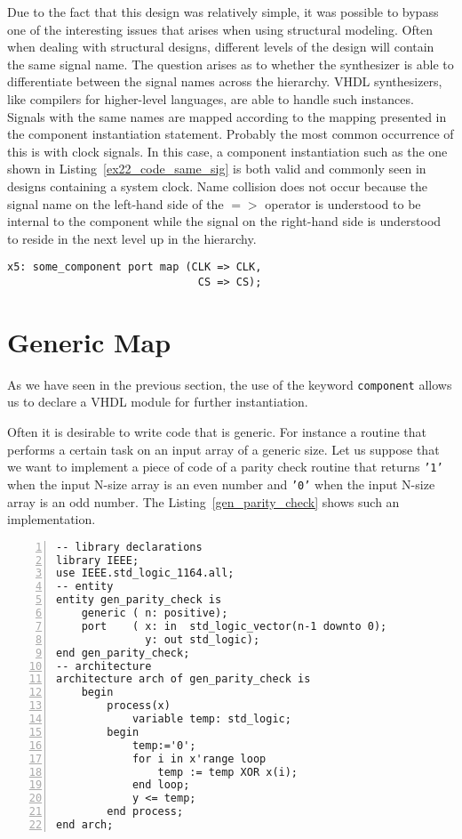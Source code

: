 Due to the fact that this design was relatively simple, it was possible to bypass one of the interesting issues that arises when using structural modeling. Often when dealing with structural designs, different levels of the design will contain the same signal name. The question arises as to whether the synthesizer is able to differentiate between the signal names across the hierarchy. VHDL synthesizers, like compilers for higher-level languages, are able to handle such instances. Signals with the same names are mapped according to the mapping presented in the component instantiation statement. Probably the most common occurrence of this is with clock signals. In this case, a component instantiation such as the one shown in Listing~\ref{ex22_code_same_sig} is both valid and commonly seen in designs containing a system clock. Name collision does not occur because the signal name on the left-hand side of the $=>$ operator is understood to be internal to the component while the signal on the right-hand side is understood to reside in the next level up in the hierarchy.

\noindent
\begin{minipage}{0.99\linewidth}
\begin{lstlisting}[label=ex22_code_same_sig, caption=Example of the same signal name crossing hierarchical boundaries.]
x5: some_component port map (CLK => CLK,
                              CS => CS);
\end{lstlisting}
\end{minipage}


\section{Generic Map}
As we have seen in the previous section, the use of the keyword \texttt{component} allows us to declare a VHDL module for further instantiation.

Often it is desirable to write code that is generic. For instance a routine that performs a certain task on an input array of a generic size. Let us suppose that we want to implement a piece of code of a parity check routine that returns \texttt{'1'} when the input N-size array is an even number and \texttt{'0'} when the input N-size array is an odd number. The Listing~\ref{gen_parity_check} shows such an implementation.

\noindent
\begin{minipage}{0.99\linewidth}
\begin{lstlisting}[numbers=left, label=gen_parity_check, caption= Parity check implementation with generic input array size.]
-- library declarations
library IEEE;
use IEEE.std_logic_1164.all;
-- entity
entity gen_parity_check is
    generic ( n: positive);
    port    ( x: in  std_logic_vector(n-1 downto 0);
              y: out std_logic);
end gen_parity_check;
-- architecture
architecture arch of gen_parity_check is
    begin
        process(x)
            variable temp: std_logic;
        begin
            temp:='0';
            for i in x'range loop
                temp := temp XOR x(i);
            end loop;
            y <= temp;
        end process;
end arch;
\end{lstlisting}
\end{minipage}

